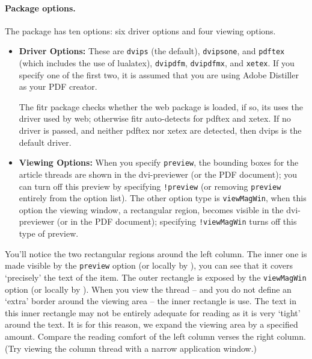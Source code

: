 \documentclass{article}
\begin{document}
\paragraph*{Package options.}
The package has ten options: six driver options and four viewing
options.
\begin{multicols}{2}\previewtrue\viewMagWintrue
{}
\begin{itemize}
\item {}%
    \textbf{Driver Options:} These are \texttt{dvips} (the default),
    \texttt{dvipsone}, and \texttt{pdftex} (which includes the use of
    \textsf{lualatex}), \texttt{dvipdfm}, \texttt{dvipdfmx}, and
    \texttt{xetex}. If you specify one of the first two, it is assumed that
    you are using \textsf{Adobe Distiller} as your PDF creator.

    The \textsf{fitr} package checks whether the \textsf{web} package is
    loaded, if so, its uses the driver used by \textsf{web}; otherwise
    \textsf{fitr} auto-detects for \textsf{pdftex} and \textsf{xetex}. If
    no driver is passed, and neither \textsf{pdftex} nor \textsf{xetex} are
    detected, then \textsf{dvips} is the default driver.


    \item {}%
        \textbf{Viewing Options:} When you specify \texttt{preview}, the
        bounding boxes for the article threads are shown in the
        dvi-previewer (or the PDF document); you can turn off this preview
        by specifying \texttt{!preview} (or removing \texttt{preview}
        entirely from the option list). The other option type is
        \texttt{viewMagWin}, when this option the viewing window, a
        rectangular region, becomes visible in the dvi-previewer (or in the
        PDF document); specifying \texttt{!viewMagWin} turns off this type
        of preview.

\end{itemize}
\end{multicols}
You'll notice the two rectangular regions around the left column. The inner
one is made visible by the \texttt{preview} option (or locally by
), you can see that it covers `precisely' the text of the
item. The outer rectangle is exposed by the \texttt{viewMagWin} option (or
locally by ). When you view the thread -- and you do not
define an `extra' border around the viewing area -- the inner rectangle is
use. The text in this inner rectangle may not be entirely adequate for
reading as it is very `tight' around the text. It is for this reason, we
expand the viewing area by a specified amount. Compare the reading comfort of
the left column verses the right column. (Try viewing the column thread with
a narrow application window.)
\end{document}
